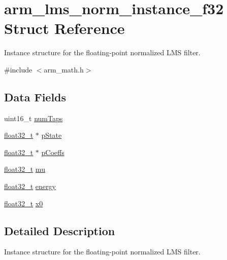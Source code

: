 \hypertarget{structarm__lms__norm__instance__f32}{}\section{arm\+\_\+lms\+\_\+norm\+\_\+instance\+\_\+f32 Struct Reference}
\label{structarm__lms__norm__instance__f32}


Instance structure for the floating-\/point normalized L\+MS filter.  




{\ttfamily \#include $<$arm\+\_\+math.\+h$>$}

\subsection*{Data Fields}
\begin{DoxyCompactItemize}
\item 
uint16\+\_\+t \hyperlink{structarm__lms__norm__instance__f32_a751941891e47f522a7f5375fe8990aac}{num\+Taps}
\item 
\hyperlink{arm__math_8h_a4611b605e45ab401f02cab15c5e38715}{float32\+\_\+t} $\ast$ \hyperlink{structarm__lms__norm__instance__f32_a335c87e6fdc4b96601d95a5de8b9c463}{p\+State}
\item 
\hyperlink{arm__math_8h_a4611b605e45ab401f02cab15c5e38715}{float32\+\_\+t} $\ast$ \hyperlink{structarm__lms__norm__instance__f32_aacbb8dd8eeba4b21fc2bb40076405ee3}{p\+Coeffs}
\item 
\hyperlink{arm__math_8h_a4611b605e45ab401f02cab15c5e38715}{float32\+\_\+t} \hyperlink{structarm__lms__norm__instance__f32_a11402afa7c9b9dac4cb953fa386e74d2}{mu}
\item 
\hyperlink{arm__math_8h_a4611b605e45ab401f02cab15c5e38715}{float32\+\_\+t} \hyperlink{structarm__lms__norm__instance__f32_ae1ed544b72f1510ed55d144a9424fddd}{energy}
\item 
\hyperlink{arm__math_8h_a4611b605e45ab401f02cab15c5e38715}{float32\+\_\+t} \hyperlink{structarm__lms__norm__instance__f32_ab56b6f83c5b324c3ef620474b6e5a6e1}{x0}
\end{DoxyCompactItemize}


\subsection{Detailed Description}
Instance structure for the floating-\/point normalized L\+MS filter. 

